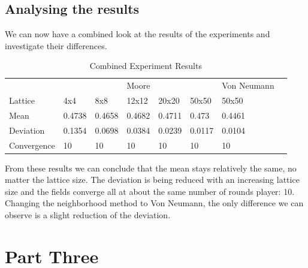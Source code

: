 \documentclass[a4paper, 11pt]{article}
\begin{document}
\newpage
\subsection{Analysing the results}

We can now have a combined look at the results of the experiments and investigate their differences.

\begin{table}[H]
\centering
\caption{Combined Experiment Results}
\begin{tabular}{l|l|l|l|l|l|l|l}
            & \multicolumn{5}{c|}{Moore}                 & Von Neumann &  \\ \cline{1-7}
Lattice     & 4x4    & 8x8    & 12x12  & 20x20  & 50x50  & 50x50       &  \\ \cline{1-7}
Mean        & 0.4738 & 0.4658 & 0.4682 & 0.4711 & 0.473  & 0.4461      &  \\ \cline{1-7}
Deviation   & 0.1354 & 0.0698 & 0.0384 & 0.0239 & 0.0117 & 0.0104      &  \\ \cline{1-7}
Convergence & 10     & 10     & 10     & 10     & 10     & 10          &  \\ \cline{1-7}
\end{tabular}
\end{table}

From these results we can conclude that the mean stays relatively the same, no matter the lattice size. The deviation is being reduced with an increasing lattice size and the fields converge all at about the same number of rounds player: 10. Changing the neighborhood method to Von Neumann, the only difference we can observe is a slight reduction of the deviation.



\newpage
\section{Part Three}
\end{document}

